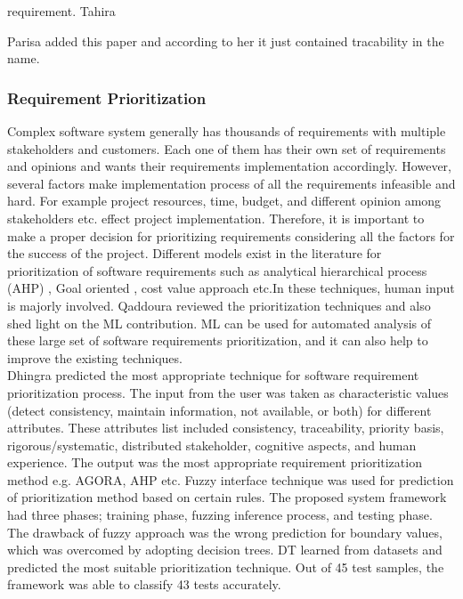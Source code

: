requirement. Tahira{Parisa added this paper and according to her it just contained tracability in the name.\\

\subsubsection{Requirement Prioritization}
Complex software system generally has thousands of requirements with multiple
stakeholders and customers. Each one of them has their own set of requirements
and opinions and wants their requirements implementation accordingly. However,
several factors make implementation process of all the requirements infeasible
and hard. For example project resources, time, budget, and different opinion among
stakeholders etc. effect project implementation. Therefore, it
is important to make a proper decision for prioritizing requirements considering
all the factors for the success of the project. Different models exist in the
literature for prioritization of software requirements such as analytical
hierarchical process (AHP) \cite{saaty2008}, Goal oriented
\cite{VanLamsweerde:2001}, cost value approach \cite{Karlsson:1997} etc.In these
techniques, human input is majorly involved. Qaddoura \etal \cite{RQaddoura}
reviewed the prioritization techniques and also shed light on the ML
contribution. ML can be used for automated analysis of these large set of
software requirements prioritization, and it can also help to improve the existing techniques.\\

	Dhingra \etal  \cite{S.Dhingra} predicted the most appropriate technique for
software requirement prioritization process. The input from the user was taken as characteristic values (detect consistency, maintain information, not available, or both) for different attributes. These attributes list included consistency,
traceability, priority basis, rigorous/systematic, distributed stakeholder,
cognitive aspects, and human experience. The output was the
most appropriate requirement prioritization method e.g. AGORA, AHP etc. Fuzzy interface technique was
used for prediction of prioritization method based on certain rules. The
proposed system framework had three phases; training phase, fuzzing inference
process, and testing phase. The drawback of fuzzy approach was the wrong prediction
for boundary values, which was overcomed by adopting decision trees. DT learned from datasets and
predicted the most suitable prioritization technique. Out of 45 test samples, the
framework was able to classify 43 tests accurately.\\

}
